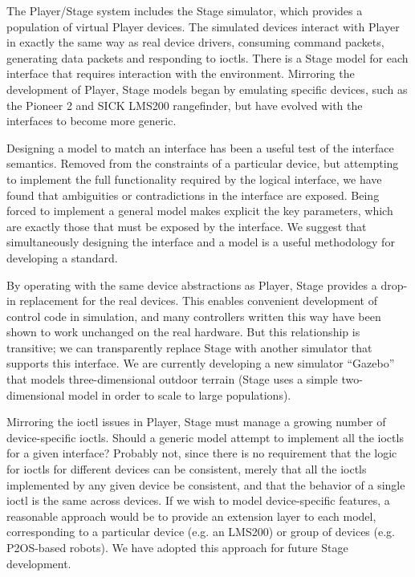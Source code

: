 \documentclass[letterpaper, 10 pt, conference]{iros03}
\begin{document}
The Player/Stage system includes the Stage simulator, which provides a
population of virtual Player devices. The simulated devices interact
with Player in exactly the same way as real device drivers, consuming
command packets, generating data packets and responding to ioctls.
There is a Stage model for each interface that requires interaction
with the environment. Mirroring the development of Player, Stage
models began by emulating specific devices, such as the Pioneer 2 and
SICK LMS200 rangefinder, but have evolved with the interfaces to
become more generic.

Designing a model to match an interface has been a useful test of the
interface semantics. Removed from the constraints of a particular
device, but attempting to implement the full functionality required by
the logical interface, we have found that ambiguities or
contradictions in the interface are exposed. Being forced to implement
a general model makes explicit the key parameters, which are exactly
those that must be exposed by the interface. We suggest that
simultaneously designing the interface and a model is a useful
methodology for developing a standard.

By operating with the same device abstractions as Player, Stage
provides a drop-in replacement for the real devices. This enables
convenient development of control code in simulation, and many
controllers written this way have been shown to work unchanged on the
real hardware. But this relationship is transitive; we can
transparently replace Stage with another simulator that supports this
interface. We are currently developing a new simulator ``Gazebo'' that
models three-dimensional outdoor terrain (Stage uses a simple
two-dimensional model in order to scale to large populations).

Mirroring the ioctl issues in Player, Stage must manage a growing
number of device-specific ioctls. Should a generic model attempt to
implement all the ioctls for a given interface?  Probably not, since
there is no requirement that the logic for ioctls for different
devices can be consistent, merely that all the ioctls implemented by
any given device be consistent, and that the behavior of a single
ioctl is the same across devices. If we wish to model device-specific
features, a reasonable approach would be to provide an extension layer
to each model, corresponding to a particular device (e.g. an LMS200)
or group of devices (e.g.  P2OS-based robots). We have adopted this
approach for future Stage development.
\end{document}
